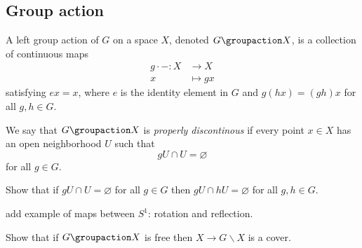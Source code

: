   \subsection{Group action}
  A left group action of $G$ on a space $X$, denoted $G \groupaction X$, is a collection of continuous maps
  \begin{align*}
    g \cdot - : X &\longrightarrow X\\
    x &\longmapsto gx
  \end{align*}
  satisfying $ex = x$, where $e$ is the identity element in $G$ and $g(hx) = (gh)x$ for all $g,h \in G$.
  \begin{definition}
    We say that $G \groupaction X$ is \emph{properly discontinous} if every point $x \in X$ has an open neighborhood $U$ such that
    \begin{equation*}
      g U \cap U = \varnothing
    \end{equation*}
    for all $g \in G$.
  \end{definition}
  \begin{qbox}
    Show that if $g U \cap U = \varnothing$ for all $g \in G$ then $g U \cap hU = \varnothing$ for all $g,h \in G$.
  \end{qbox}
  \begin{ex}
    add example of maps between $S^1$: rotation and reflection.
  \end{ex}
  \begin{qbox}
    Show that if $G \groupaction X$ is free then $X \rightarrow G \backslash X$ is a cover.
  \end{qbox}

